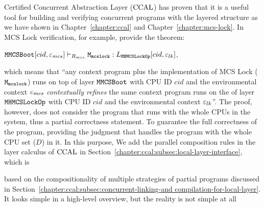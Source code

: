 Certified Concurrent Abstraction Layer  ($\ccalname$)
has proven that it is a useful tool 
for building and verifying concurrent programs with the layered structure 
as we have shown in Chapter~\ref{chapter:ccal} and Chapter~\ref{chapter:mcs-lock}.
In MCS Lock verification, for example, provide 
the theorem:
\begin{center}
$\ltyp{\PLayer{\mmcsbootfull}{cid}{\oracle_{mcs}}}{R_{mcs}}{\codeinmath{M}_{\codeinmath{mcslock}}}{\PLayer{L_{\mhmcslockopfull}}{cid}{\oracle_{lk}}}$,
\end{center}
which means that ``any context program plus the implementation of MCS Lock ($\codeinmath{M}_{\codeinmath{mcslock}}$) runs on top of 
  layer $\mmcsbootfull$ with CPU ID $cid$ and the environmental context $\oracle_{mcs}$ \textit{contextually refines}
 the same context program runs on the of  layer $\mhmcslockopfull$ with CPU ID $cid$ and the environmental context $\oracle_{lk}$''. 
The proof, however, does not consider the program that runs with the whole CPUs in the system, thus a partial correctness statement. 
To guarantee the full correctness of the program,
providing the judgment that handles the program with the whole CPU set ($D$) in it. 
In this purpose, 
We add the parallel composition rules in the layer calculus of $\ccalname$ in Section~\ref{chapter:ccal:subsec:local-layer-interface}, which is 
\begin{mathpar}
\end{mathpar}
based on the compositionality of multiple strategies 
of partial programs discussed in Section~\ref{chapter:ccal:subsec:concurrent-linking-and compilation-for-local-layer}.   
It looks simple in a high-level overview, but the reality is not simple at all
